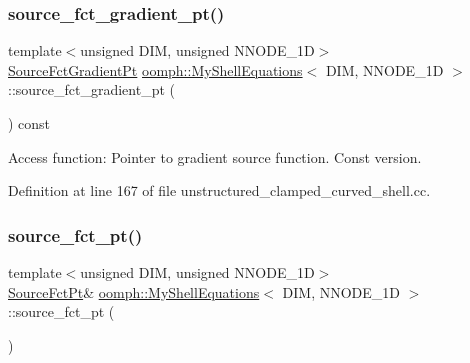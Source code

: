 \subsubsection{\texorpdfstring{source\+\_\+fct\+\_\+gradient\+\_\+pt()}{source\_fct\_gradient\_pt()}\hspace{0.1cm}{\footnotesize\ttfamily [2/2]}}
{\footnotesize\ttfamily template$<$unsigned D\+IM, unsigned N\+N\+O\+D\+E\+\_\+1D$>$ \\
\hyperlink{classoomph_1_1MyShellEquations_a954dcc1b78710f331ed390b716aa07dd}{Source\+Fct\+Gradient\+Pt} \hyperlink{classoomph_1_1MyShellEquations}{oomph\+::\+My\+Shell\+Equations}$<$ D\+IM, N\+N\+O\+D\+E\+\_\+1D $>$\+::source\+\_\+fct\+\_\+gradient\+\_\+pt (\begin{DoxyParamCaption}{ }\end{DoxyParamCaption}) const\hspace{0.3cm}{\ttfamily [inline]}}



Access function\+: Pointer to gradient source function. Const version. 



Definition at line 167 of file unstructured\+\_\+clamped\+\_\+curved\+\_\+shell.\+cc.

\mbox{\label{classoomph_1_1MyShellEquations_a8aee1d7092584b9ad7095dfd905f5893}} 
\subsubsection{\texorpdfstring{source\+\_\+fct\+\_\+pt()}{source\_fct\_pt()}\hspace{0.1cm}{\footnotesize\ttfamily [1/2]}}
{\footnotesize\ttfamily template$<$unsigned D\+IM, unsigned N\+N\+O\+D\+E\+\_\+1D$>$ \\
\hyperlink{classoomph_1_1MyShellEquations_a056d2488b6e65787f5c9935a321b7a9b}{Source\+Fct\+Pt}\& \hyperlink{classoomph_1_1MyShellEquations}{oomph\+::\+My\+Shell\+Equations}$<$ D\+IM, N\+N\+O\+D\+E\+\_\+1D $>$\+::source\+\_\+fct\+\_\+pt (\begin{DoxyParamCaption}{ }\end{DoxyParamCaption})\hspace{0.3cm}{\ttfamily [inline]}}



